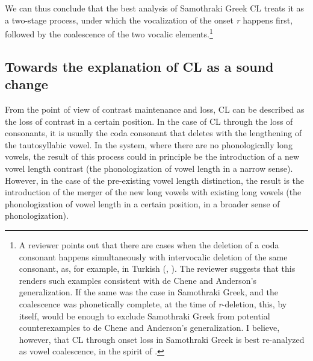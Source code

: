 \documentclass[output=paper,
modfonts
]{LSP/langsci}
\begin{document}
We can thus conclude that the best analysis of Samothraki Greek CL
treats it as a two-stage process, under which the vocalization of the
onset \emph{r} happens first, followed by the coalescence of the two
vocalic elements.\footnote{A reviewer points out that there are cases
  when the deletion of a coda consonant happens simultaneously with
  intervocalic deletion of the same consonant, as, for example, in
  Turkish (\citealt{deChene1979}, \citealt[23]{kavitskaya2002}). The
  reviewer suggests that this renders such examples consistent with de
  Chene and Anderson's generalization. If the same was the case in
  Samothraki Greek, and the coalescence was phonetically complete, at
  the time of \emph{r}-deletion, this, by itself, would be enough to
  exclude Samothraki Greek from potential counterexamples to de Chene
  and Anderson's generalization. I believe, however, that CL through
  onset loss in Samothraki Greek is best re-analyzed as vowel
  coalescence, in the spirit of \citet{kiparsky2011k}.}

\subsection{Towards the explanation of CL as a sound change}

From the point of view of contrast maintenance and loss, CL can be
described as the loss of contrast in a certain position. In the case of
CL through the loss of consonants, it is usually the coda consonant that
deletes with the lengthening of the tautosyllabic vowel. In the system,
where there are no phonologically long vowels, the result of this
process could in principle be the introduction of a new vowel length
contrast (the phonologization of vowel length in a narrow sense).
However, in the case of the pre-existing vowel length distinction, the
result is the introduction of the merger of the new long vowels with
existing long vowels (the phonologization of vowel length in a certain
position, in a broader sense of phonologization).
\end{document}
